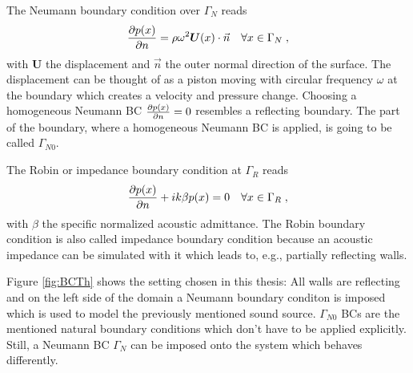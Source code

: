 \documentclass[%
  a4paper,oneside,%
  11pt,%
  smallchapters,
  style=printdev,
  extramargin,
  green,%
  rgb, <cmyk>
  ]{tubsbook}
\begin{document}
	
The Neumann boundary condition over $\Gamma_N$ reads
\begin{equation}
\pdv{p(x)}{n} = \rho \omega^2 \bm{U}(x) \cdot \vec{n} \quad \forall x \in \Gamma_N \;,
\label{eqn:NeumannBCDef}
\end{equation}
with $\bm{U}$ the displacement and $\vec{n}$ the outer normal direction of the surface. The displacement can be thought of as a piston moving with circular frequency $\omega$ at the boundary which creates a velocity and pressure change. Choosing a homogeneous Neumann BC $\pdv{p(x)}{n} = 0$ resembles a reflecting boundary. The part of the boundary, where a homogeneous Neumann BC is applied, is going to be called $\Gamma_{N0}$.

The Robin or impedance boundary condition at $\Gamma_R$ reads
\begin{equation}
\pdv{p(x)}{n} + ik \beta p(x) = 0 \quad \forall x \in \Gamma_R \;,
\end{equation}
with $\beta$ the specific normalized acoustic admittance. The Robin boundary condition is also called impedance boundary condition because an acoustic impedance can be simulated with it which leads to, e.g., partially reflecting walls.


Figure \ref{fig:BCTh} shows the setting chosen in this thesis: All walls are reflecting and on the left side of the domain a Neumann boundary conditon is imposed which is used to model the previously mentioned sound source. 
$\Gamma_{N0}$ BCs are the mentioned natural boundary conditions which don't have to be applied explicitly. Still, a Neumann BC $\Gamma_{N}$ can be imposed onto the system which behaves differently. 

\end{document}
